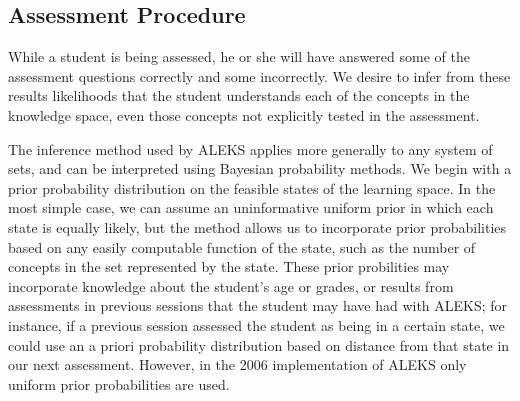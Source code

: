 \documentclass[11pt]{llncs}
\begin{document}
{\subsection{Assessment Procedure}

While a student is being assessed, he or she will have answered some of the assessment questions correctly and some incorrectly. We desire to infer from these results likelihoods that the student understands each of the concepts in the knowledge space, even those concepts not explicitly tested in the assessment.

The inference method used by ALEKS \citep{falmagne:88a,falma90} applies more generally to any system of sets, and can be interpreted using Bayesian probability methods.
We begin with a prior probability distribution on the feasible states of the learning space. In the most simple case, we can assume an uninformative uniform prior in which each state is equally likely, but the method allows us to incorporate prior probabilities based on any easily computable function of the state, such as the number of concepts in the set represented by the state. These prior probilities may incorporate knowledge about the student's age or grades, or results from assessments in previous sessions that the student may have had with ALEKS; for instance, if a previous session assessed the student as being in a certain state, we could use an a priori probability distribution based on distance from that state in our next assessment. However, in the 2006 implementation of ALEKS only uniform prior probabilities are used.

}
\end{document}
